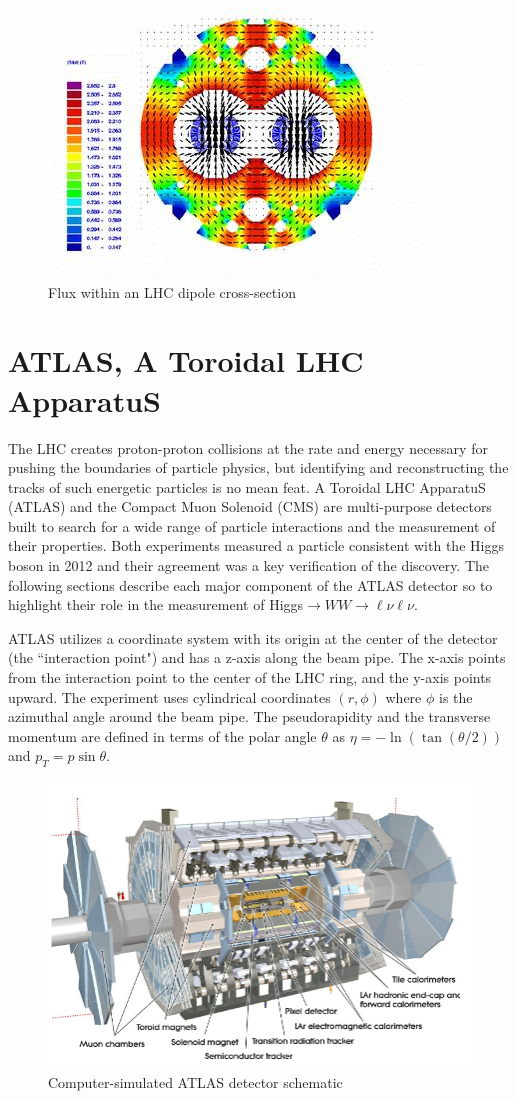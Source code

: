 \begin{figure}[!h]
        \centering
    \includegraphics[width=.6\textwidth]{Pictures/dipolemagnet.jpg}
    \caption{ Flux within an LHC dipole cross-section \cite{LHCref}}
    \label{fig:dipolemagnet}
\end{figure}

\section{ATLAS, A Toroidal LHC ApparatuS}
\hspace{20pt} The LHC creates proton-proton collisions at the rate and energy necessary for pushing the boundaries of particle physics, but identifying and reconstructing the tracks of such energetic particles is no mean feat. A Toroidal LHC ApparatuS (ATLAS) and the Compact Muon Solenoid (CMS) are multi-purpose detectors built to search for a wide range of particle interactions and the measurement of their properties. Both experiments measured a particle consistent with the Higgs boson in 2012 and their agreement was a key verification of the discovery. The following sections describe each major component of the ATLAS detector so to highlight their role in the measurement of Higgs$\rightarrow WW \rightarrow \ell\nu\ell\nu$. 

ATLAS utilizes a coordinate system with its origin at the center of the detector (the ``interaction point") and has a z-axis along the beam pipe. The x-axis points from the interaction point to the center of the LHC ring, and the y-axis points upward. The experiment uses cylindrical coordinates $(r, \phi)$ where $\phi$ is the azimuthal angle around the beam pipe. The pseudorapidity and the transverse momentum are defined in terms of the polar angle $\theta$ as $\eta = -\ln( \tan(\theta/2))$ and $p_T = p\sin\theta$. 
\begin{figure}[!h]
	\centering     \includegraphics[width=.7\textwidth]{Pictures/ATLASdetector.PNG}
    \caption{Computer-simulated ATLAS detector schematic \cite{detector}}
\end{figure}

